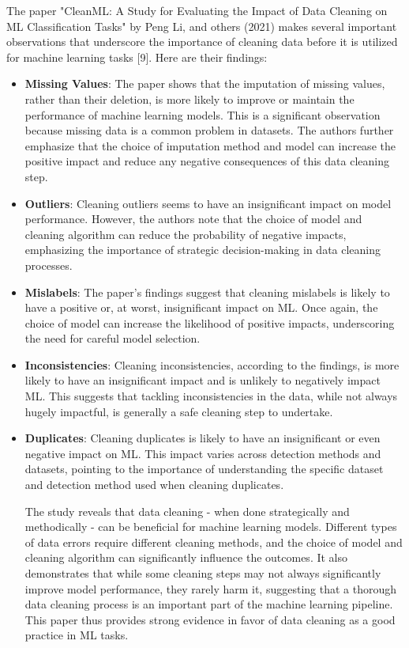 \documentclass{article}
\begin{document}
The paper "CleanML: A Study for Evaluating the Impact of Data Cleaning on ML Classification Tasks" by Peng Li, and others (2021) makes several important observations that underscore the importance of cleaning data before it is utilized for machine learning tasks [9]. Here are their findings:

\begin{itemize}

\item \textbf{Missing Values}: The paper shows that the imputation of missing values, rather than their deletion, is more likely to improve or maintain the performance of machine learning models. This is a significant observation because missing data is a common problem in datasets. The authors further emphasize that the choice of imputation method and model can increase the positive impact and reduce any negative consequences of this data cleaning step.

\item \textbf{Outliers}: Cleaning outliers seems to have an insignificant impact on model performance. However, the authors note that the choice of model and cleaning algorithm can reduce the probability of negative impacts, emphasizing the importance of strategic decision-making in data cleaning processes.

\item \textbf{Mislabels}: The paper's findings suggest that cleaning mislabels is likely to have a positive or, at worst, insignificant impact on ML. Once again, the choice of model can increase the likelihood of positive impacts, underscoring the need for careful model selection.

\item  \textbf{Inconsistencies}: Cleaning inconsistencies, according to the findings, is more likely to have an insignificant impact and is unlikely to negatively impact ML. This suggests that tackling inconsistencies in the data, while not always hugely impactful, is generally a safe cleaning step to undertake.

\item \textbf{Duplicates}: Cleaning duplicates is likely to have an insignificant or even negative impact on ML. This impact varies across detection methods and datasets, pointing to the importance of understanding the specific dataset and detection method used when cleaning duplicates.

The study reveals that data cleaning - when done strategically and methodically - can be beneficial for machine learning models. Different types of data errors require different cleaning methods, and the choice of model and cleaning algorithm can significantly influence the outcomes. It also demonstrates that while some cleaning steps may not always significantly improve model performance, they rarely harm it, suggesting that a thorough data cleaning process is an important part of the machine learning pipeline. This paper thus provides strong evidence in favor of data cleaning as a good practice in ML tasks.


\end{itemize}
\end{document}
